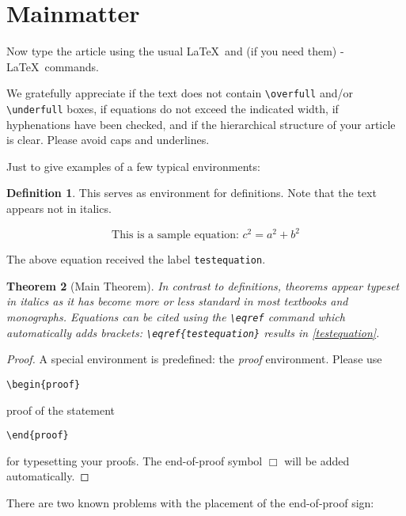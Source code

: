 \documentclass{birkjour}
\newtheorem{thm}{Theorem}[section]
\theoremstyle{definition}
\newtheorem{defn}[thm]{Definition}
\theoremstyle{remark}
\numberwithin{equation}{section}
\begin{document}
\section{Mainmatter}
Now type the article using the usual \LaTeX\ and (if you need them)
\AmS-\LaTeX\ commands.

We gratefully appreciate if the text does
not contain \verb+\overfull+ and/or \verb+\underfull+ boxes, if equations do not exceed the indicated width, if hyphenations have been checked, and if the hierarchical structure of your article is clear. Please avoid caps and underlines.

Just to give examples of a few typical environments:

\begin{defn}
This serves as environment for definitions. Note that the text appears not in italics.
\end{defn}

\begin{equation}\label{testequation}
\text{This is a sample equation: } c^2=a^2+b^2
\end{equation}

The above equation received the label \verb+testequation+.

\begin{thm}[Main Theorem]
In contrast to definitions, theorems appear typeset in italics as
it has become more or less standard in most textbooks and
monographs. Equations can be cited using the \verb+\eqref+ command which
automatically adds brackets: \verb+\eqref{testequation}+ results in \eqref{testequation}.
\end{thm}

\begin{proof}
A special environment is predefined: the \textit{proof} environment. Please use
\begin{verbatim}\begin{proof}\end{verbatim}
proof of the statement
\begin{verbatim}\end{proof}\end{verbatim}
for typesetting your proofs. The end-of-proof symbol $\Box$ will be added automatically.
\end{proof}

There are two known problems with the placement of the end-of-proof sign:
\end{document}
